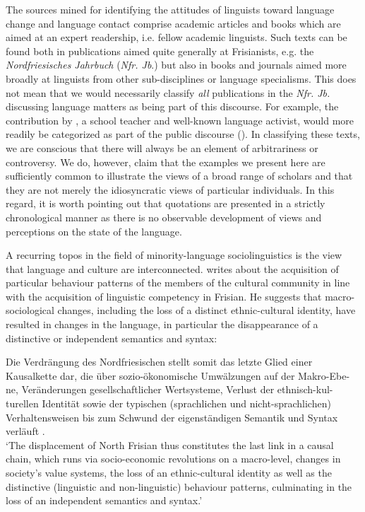 \documentclass[output=paper]{langsci/langscibook}
\begin{document}
The sources mined for identifying the attitudes of linguists toward language change and language contact comprise academic articles and books which are aimed at an expert readership, i.e. fellow academic linguists. Such texts can be found both in publications aimed quite generally at Frisianists, e.g. the \textit{Nordfriesisches Jahrbuch} (\textit{Nfr. Jb}.) but also in books and journals aimed more broadly at linguists from other sub-disciplines or language specialisms. This does not mean that we would necessarily classify \textit{all} publications in the \textit{Nfr. Jb.} discussing language matters as being part of this discourse. For example, the contribution by \citet{Ingwersen1966}, a school teacher and well-known language activist, would more readily be categorized as part of the public discourse (). In classifying these texts, we are conscious that there will always be an element of arbitrariness or controversy. We do, however, claim that the examples we present here are sufficiently common to illustrate the views of a broad range of scholars and that they are not merely the idiosyncratic views of particular individuals. In this regard, it is worth pointing out that quotations are presented in a strictly chronological manner as there is no observable development of views and perceptions on the state of the language. 

A recurring topos in the field of minority-language sociolinguistics is the view that language and culture are interconnected. \citet[473]{Sjolin1997} writes about the acquisition of particular behaviour patterns of the members of the cultural community in line with the acquisition of linguistic competency in Frisian. He suggests that macro-sociological changes, including the loss of a distinct ethnic-cultural identity, have resulted in changes in the language, in particular the disappearance of a distinctive or independent semantics and syntax: 

\begin{modquote}
Die Verdrängung des Nordfriesischen stellt somit das letzte Glied einer Kausalkette dar, die über sozio-ökonomische Umwälzungen auf der Makro-Ebe-ne, Veränderungen gesellschaftlicher Wertsysteme, Verlust der ethnisch-kul-turellen Identität sowie der typischen (sprachlichen und nicht-sprachlichen) Verhaltensweisen bis zum Schwund der eigenständigen Semantik und Syntax verläuft \citep[473]{Sjolin1997}.\smallskip\\\relax
‘The displacement of North Frisian thus constitutes the last link in a causal chain, which runs via socio-economic revolutions on a macro-level, changes in society’s value systems, the loss of an ethnic-cultural identity as well as the distinctive (linguistic and non-linguistic) behaviour patterns, culminating in the loss of an independent semantics and syntax.’
\end{modquote}
\end{document}
